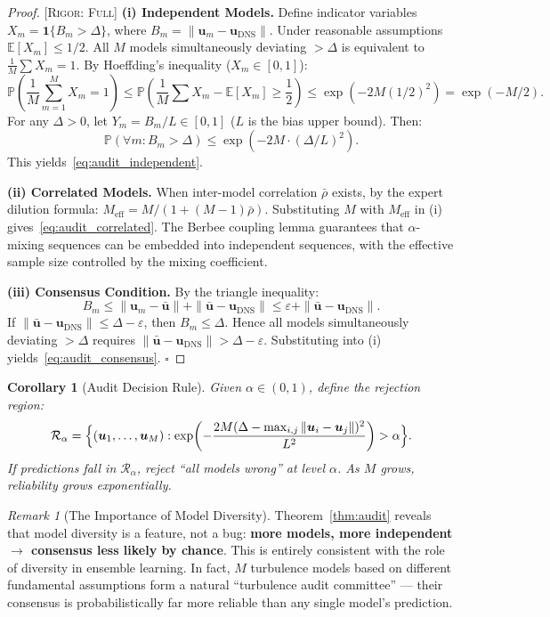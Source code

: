 \documentclass[11pt,a4paper]{article}
\newtheorem{corollary}[theorem]{Corollary}
\theoremstyle{definition}
\theoremstyle{remark}
\newtheorem{remark}[theorem]{Remark}
\newcommand{\norm}[1]{\left\lVert#1\right\rVert}
\newcommand{\rigorFull}{\textsc{[Rigor: Full]}}
\begin{document}
\begin{proof}
\rigorFull
\textbf{(i) Independent Models.} Define indicator variables $X_m = \mathbf{1}\{B_m > \Delta\}$, where $B_m = \|\bm{u}_m - \bm{u}_{\text{DNS}}\|$. Under reasonable assumptions $\mathbb{E}[X_m] \leq 1/2$. All $M$ models simultaneously deviating $> \Delta$ is equivalent to $\frac{1}{M}\sum X_m = 1$. By Hoeffding's inequality ($X_m \in [0,1]$):
\[
\mathbb{P}\!\left(\frac{1}{M}\sum_{m=1}^M X_m = 1\right)
\leq \mathbb{P}\!\left(\frac{1}{M}\sum X_m - \mathbb{E}[X_m] \geq \frac{1}{2}\right)
\leq \exp\!\left(-2M(1/2)^2\right) = \exp(-M/2).
\]
For any $\Delta > 0$, let $Y_m = B_m/L \in [0,1]$ ($L$ is the bias upper bound). Then:
\[
\mathbb{P}(\forall m: B_m > \Delta) \leq \exp(-2M \cdot (\Delta/L)^2).
\]
This yields~\eqref{eq:audit_independent}.

\textbf{(ii) Correlated Models.} When inter-model correlation $\bar{\rho}$ exists, by the expert dilution formula: $M_{\text{eff}} = M/(1+(M-1)\bar{\rho})$. Substituting $M$ with $M_{\text{eff}}$ in (i) gives~\eqref{eq:audit_correlated}. The Berbee coupling lemma guarantees that $\alpha$-mixing sequences can be embedded into independent sequences, with the effective sample size controlled by the mixing coefficient.

\textbf{(iii) Consensus Condition.} By the triangle inequality:
\[
B_m \leq \|\bm{u}_m - \bar{\bm{u}}\| + \|\bar{\bm{u}} - \bm{u}_{\text{DNS}}\| \leq \varepsilon + \|\bar{\bm{u}} - \bm{u}_{\text{DNS}}\|.
\]
If $\|\bar{\bm{u}} - \bm{u}_{\text{DNS}}\| \leq \Delta - \varepsilon$, then $B_m \leq \Delta$. Hence all models simultaneously deviating $> \Delta$ requires $\|\bar{\bm{u}} - \bm{u}_{\text{DNS}}\| > \Delta - \varepsilon$. Substituting into (i) yields~\eqref{eq:audit_consensus}. $\square$
\end{proof}

\begin{corollary}[Audit Decision Rule]
\label{cor:audit_rule}
Given $\alpha \in (0, 1)$, define the rejection region:
\begin{equation}
  \mathcal{R}_{\alpha} = \Bigl\{ (\bm{u}_1, \dots, \bm{u}_M) :
  \exp\!\left(-\frac{2M(\Delta - \max_{i,j}\norm{\bm{u}_i - \bm{u}_j})^2}{L^2}\right) > \alpha \Bigr\}.
\end{equation}
If predictions fall in $\mathcal{R}_{\alpha}$, reject ``all models wrong'' at level $\alpha$. As $M$ grows, reliability grows exponentially.
\end{corollary}

\begin{remark}[The Importance of Model Diversity]
Theorem~\ref{thm:audit} reveals that model diversity is a feature, not a bug: \textbf{more models, more independent $\to$ consensus less likely by chance}. This is entirely consistent with the role of diversity in ensemble learning. In fact, $M$ turbulence models based on different fundamental assumptions form a natural ``turbulence audit committee'' --- their consensus is probabilistically far more reliable than any single model's prediction.
\end{remark}
\end{document}
